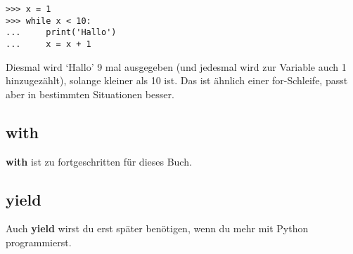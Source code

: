 \begin{Verbatim}[frame=single]
>>> x = 1
>>> while x < 10:
...     print('Hallo')
...     x = x + 1
\end{Verbatim}

Diesmal wird `Hallo' 9 mal ausgegeben (und jedesmal wird zur Variable  auch 1 hinzugezählt), solange  kleiner als 10 ist. Das ist ähnlich einer for-Schleife, passt aber in bestimmten Situationen besser.

\subsection*{with}

\textbf{with} ist zu fortgeschritten für dieses Buch.

\subsection*{yield}
Auch \textbf{yield} wirst du erst später benötigen, wenn du mehr mit Python programmierst.

\newpage
